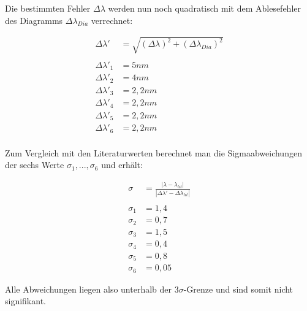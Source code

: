 \documentclass{article}
\begin{document}
Die bestimmten Fehler $\Delta \lambda$ werden nun noch quadratisch mit dem Ablesefehler des Diagramms $\Delta\lambda_{Dia}$ verrechnet:

\begin{equation}
    \begin{split}
        \Delta \lambda' &= \sqrt{(\Delta \lambda)^2 + (\Delta\lambda_{Dia})^2} \\ \\
        \Delta \lambda'_1 &= 5nm\\
        \Delta \lambda'_2 &= 4nm\\
        \Delta \lambda'_3 &= 2,2nm\\
        \Delta \lambda'_4 &= 2,2nm\\
        \Delta \lambda'_5 &= 2,2nm\\
        \Delta \lambda'_6 &= 2,2nm\\
    \end{split}
\end{equation}

Zum Vergleich mit den Literaturwerten berechnet man die Sigmaabweichungen der sechs Werte $\sigma_1, ..., \sigma_6$ und erhält:

\begin{equation}
    \begin{split}
        \sigma &= \frac{\left| \lambda - \lambda_{lit} \right|}{\left| \Delta \lambda' - \Delta \lambda_{lit} \right|} \\ \\
        \sigma_1 &= 1,4 \\
        \sigma_2 &= 0,7\\
        \sigma_3 &= 1,5\\
        \sigma_4 &= 0,4\\
        \sigma_5 &= 0,8\\
        \sigma_6 &= 0,05
    \end{split}
\end{equation}

Alle Abweichungen liegen also unterhalb der $3\sigma$-Grenze und sind somit nicht signifikant.
\end{document}
